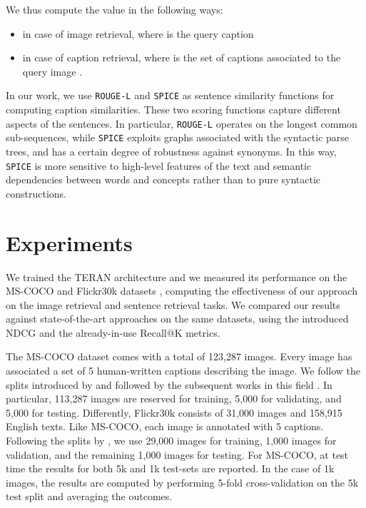 \documentclass[acmsmall]{acmart}
\begin{document}
We thus compute the  value in the following ways:
\begin{itemize}
    \item  in case of image retrieval, where  is the query caption
    \item  in case of caption retrieval, where  is the set of captions associated to the query image . 
\end{itemize}

In our work, we use \texttt{ROUGE-L}\cite{lin-2004-rouge} and \texttt{SPICE}\cite{AndersonFJG16spice} as sentence similarity functions  for computing caption similarities. These two scoring functions capture different aspects of the sentences. In particular, \texttt{ROUGE-L} operates on the longest common sub-sequences, while \texttt{SPICE} exploits graphs associated with the syntactic parse trees, and has a certain degree of robustness against synonyms. In this way, \texttt{SPICE} is more sensitive to high-level features of the text and semantic dependencies between words and concepts rather than to pure syntactic constructions.


\section{Experiments}
\label{sec:experiments}
We trained the TERAN architecture and we measured its performance on the MS-COCO \cite{LinMBHPRDZ14coco} and Flickr30k datasets \cite{young2014image}, computing the effectiveness of our approach on the image retrieval and sentence retrieval tasks. We compared our results against state-of-the-art approaches on the same datasets, using the introduced NDCG and the already-in-use Recall@K metrics.

The MS-COCO dataset comes with a total of 123,287 images. Every image has associated a set of 5 human-written captions describing the image. 
We follow the splits introduced by \cite{karpathy2015alignment} and followed by the subsequent works in this field \cite{vsepp2018faghri,GuCJN018,li2019}. In particular, 113,287 images are reserved for training, 5,000 for validating, and 5,000 for testing.
Differently, Flickr30k consists of 31,000 images and 158,915 English texts. Like MS-COCO, each image is annotated with 5 captions. Following the splits by \cite{karpathy2015alignment}, we use 29,000 images for training, 1,000 images for validation, and the remaining 1,000 images for testing.
For MS-COCO, at test time the results for both 5k and 1k test-sets are reported. In the case of 1k images, the results are computed by performing 5-fold cross-validation on the 5k test split and averaging the outcomes.
\end{document}
